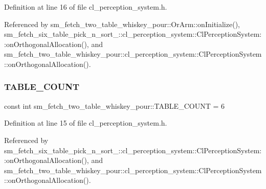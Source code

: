 Definition at line 16 of file cl\+\_\+perception\+\_\+system.\+h.



Referenced by sm\+\_\+fetch\+\_\+two\+\_\+table\+\_\+whiskey\+\_\+pour\+::\+Or\+Arm\+::on\+Initialize(), sm\+\_\+fetch\+\_\+six\+\_\+table\+\_\+pick\+\_\+n\+\_\+sort\+\_\+::cl\+\_\+perception\+\_\+system\+::\+Cl\+Perception\+System\+::on\+Orthogonal\+Allocation(), and sm\+\_\+fetch\+\_\+two\+\_\+table\+\_\+whiskey\+\_\+pour\+::cl\+\_\+perception\+\_\+system\+::\+Cl\+Perception\+System\+::on\+Orthogonal\+Allocation().

\mbox{\label{namespacesm__fetch__two__table__whiskey__pour_a17b0c4eed9dc45b1cdf81aeb8cab3fda}} 
\subsubsection{\texorpdfstring{T\+A\+B\+L\+E\+\_\+\+C\+O\+U\+NT}{TABLE\_COUNT}}
{\footnotesize\ttfamily const int sm\+\_\+fetch\+\_\+two\+\_\+table\+\_\+whiskey\+\_\+pour\+::\+T\+A\+B\+L\+E\+\_\+\+C\+O\+U\+NT = 6}



Definition at line 15 of file cl\+\_\+perception\+\_\+system.\+h.



Referenced by sm\+\_\+fetch\+\_\+six\+\_\+table\+\_\+pick\+\_\+n\+\_\+sort\+\_\+::cl\+\_\+perception\+\_\+system\+::\+Cl\+Perception\+System\+::on\+Orthogonal\+Allocation(), and sm\+\_\+fetch\+\_\+two\+\_\+table\+\_\+whiskey\+\_\+pour\+::cl\+\_\+perception\+\_\+system\+::\+Cl\+Perception\+System\+::on\+Orthogonal\+Allocation().

